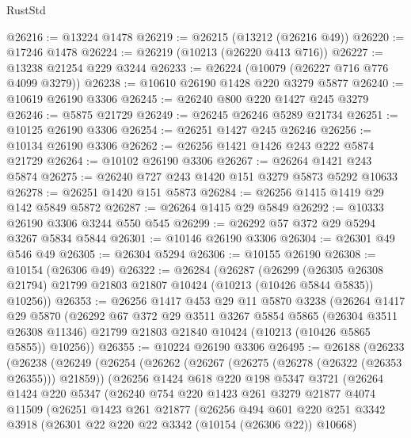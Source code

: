 \begin{lexlean}{RustStd}
\begin{coremodule}
{\begin{coremodule}
{{{{{{{{{{{{{{{{{{{{{{{{{{@26216 := @13224 @1478
@26219 := @26215 (@13212 (@26216 @49))
@26220 := @17246 @1478
@26224 := @26219 (@10213 (@26220 @413 @716))
@26227 := @13238 @21254 @229 @3244
@26233 := @26224 (@10079 (@26227 @716 @776 @4099 @3279))
@26238 := @10610 @26190 @1428 @220 @3279 @5877
@26240 := @10619 @26190 @3306
@26245 := @26240 @800 @220 @1427 @245 @3279
@26246 := @5875 @21729
@26249 := @26245 @26246 @5289 @21734
@26251 := @10125 @26190 @3306
@26254 := @26251 @1427 @245 @26246
@26256 := @10134 @26190 @3306
@26262 := @26256 @1421 @1426 @243 @222 @5874 @21729
@26264 := @10102 @26190 @3306
@26267 := @26264 @1421 @243 @5874
@26275 := @26240 @727 @243 @1420 @151 @3279 @5873 @5292 @10633
@26278 := @26251 @1420 @151 @5873
@26284 := @26256 @1415 @1419 @29 @142 @5849 @5872
@26287 := @26264 @1415 @29 @5849
@26292 := @10333 @26190 @3306 @3244 @550 @545
@26299 := @26292 @57 @372 @29 @5294 @3267 @5834 @5844
@26301 := @10146 @26190 @3306
@26304 := @26301 @49 @546 @49
@26305 := @26304 @5294
@26306 := @10155 @26190
@26308 := @10154 (@26306 @49)
@26322 := @26284
    (@26287
      (@26299
        (@26305 @26308 @21794)
        @21799
        @21803
        @21807
        @10424
        (@10213 (@10426 @5844 @5835))
        @10256))
@26353 := @26256
    @1417
    @453
    @29
    @11
    @5870
    @3238
    (@26264
      @1417
      @29
      @5870
      (@26292
        @67
        @372
        @29
        @3511
        @3267
        @5854
        @5865
        (@26304 @3511 @26308 @11346)
        @21799
        @21803
        @21840
        @10424
        (@10213 (@10426 @5865 @5855))
        @10256))
@26355 := @10224 @26190 @3306
@26495 := @26188
    (@26233
      (@26238
        (@26249
          (@26254
            (@26262
              (@26267 (@26275 (@26278 (@26322 (@26353 @26355))) @21859))
              (@26256
                @1424
                @618
                @220
                @198
                @5347
                @3721
                (@26264
                  @1424
                  @220
                  @5347
                  (@26240
                    @754
                    @220
                    @1423
                    @261
                    @3279
                    @21877
                    @4074
                    @11509
                    (@26251
                      @1423
                      @261
                      @21877
                      (@26256
                        @494
                        @601
                        @220
                        @251
                        @3342
                        @3918
                        (@26301 @22 @220 @22 @3342 (@10154 (@26306 @22)) @10668)
}}}}}}}}}}}}}}}}}}}}}}}}}}
\end{coremodule}}
\end{coremodule}
\end{lexlean}
